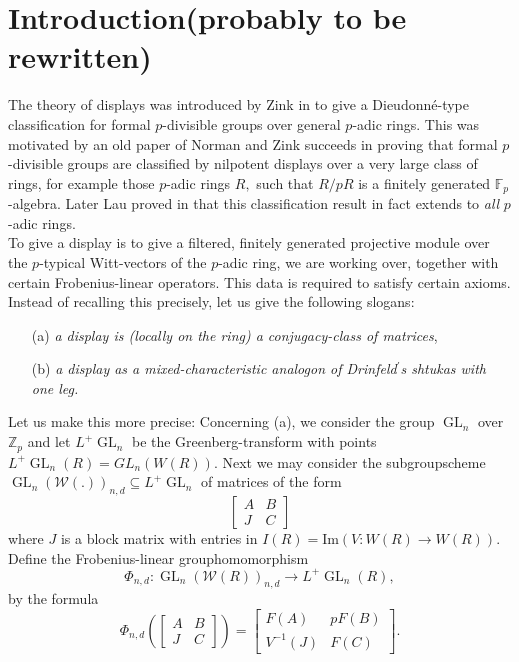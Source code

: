 \documentclass[a4paper,10,5 pt]{amsart}
\theoremstyle{definition}
\DeclareMathOperator{\GL}{GL}
\begin{document}
\tableofcontents
\newpage
\section{Introduction(probably to be rewritten)}
The theory of displays was introduced by Zink in \cite{zink-displays} to give a Dieudonné-type classification for formal $p$-divisible groups over general $p$-adic rings. This was motivated by an old paper of Norman \cite{Norman} and Zink succeeds in proving that formal $p$-divisible groups are classified by nilpotent displays over a very large class of rings, for example those $p$-adic rings $R,$ such that $R/pR$ is a finitely generated $\mathbb{F}_{p}$-algebra. Later Lau proved in \cite{Lau Inventiones} that this classification result in fact extends to \textit{all} $p$-adic rings.
\\
To give a display is to give a filtered, finitely generated projective module over the $p$-typical Witt-vectors of the $p$-adic ring, we are working over, together with certain Frobenius-linear operators. This data is required to satisfy certain axioms. Instead of recalling this precisely, let us give the following slogans:
\begin{enumerate}
\item[(a)] \textit{a display is (locally on the ring) a conjugacy-class of matrices},
\item[(b)] \textit{a display as a mixed-characteristic analogon of Drinfeld$^{\prime}$s shtukas with one leg.}
\end{enumerate}
Let us make this more precise: Concerning (a), we consider the group $\GL_{n}$ over $\mathbb{Z}_{p}$ and let $L^{+}\GL_{n}$ be the Greenberg-transform with points $L^{+}\GL_{n}(R)=GL_{n}(W(R)).$ Next we may consider the subgroupscheme $\GL_{n}(\mathcal{W}(.))_{n,d}\subseteq L^{+}\GL_{n}$ of matrices of the form
$$
\begin{bmatrix}
A & B \\
J & C
\end{bmatrix}
$$
where $J$ is a block matrix with entries in $I(R)=\text{Im}(V\colon W(R)\rightarrow W(R)).$
Define the Frobenius-linear grouphomomorphism
$$
\Phi_{n,d}\colon \GL_{n}(\mathcal{W}(R))_{n,d}\rightarrow L^{+}\GL_{n}(R),
$$
by the formula
\begin{equation}
\Phi_{n,d}(\begin{bmatrix}
A & B \\
J & C
\end{bmatrix})=\begin{bmatrix}
F(A) & pF(B) \\
V^{-1}(J) & F(C)
\end{bmatrix}.
\end{equation}
\end{document}
